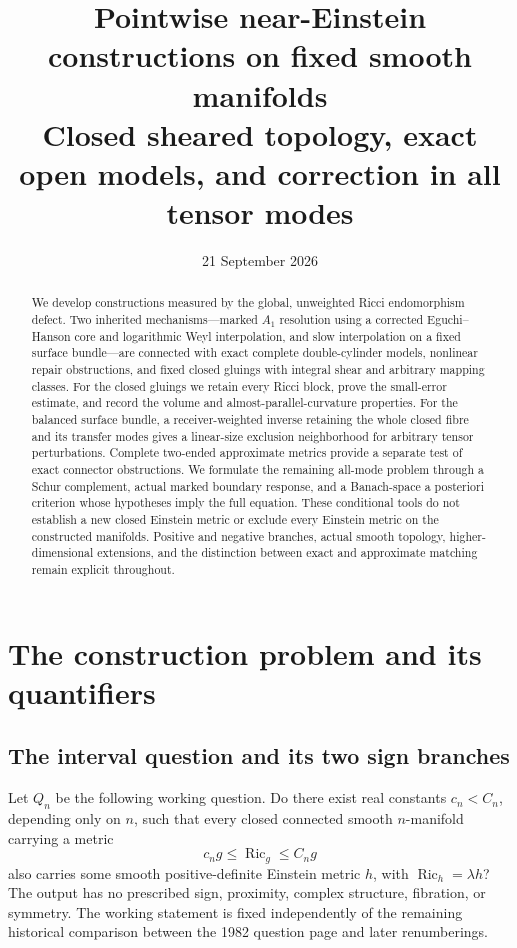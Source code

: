 \documentclass[a4paper,11pt]{article}
\title{Pointwise near-Einstein constructions on fixed smooth manifolds\\
  \large Closed sheared topology, exact open models, and correction in all tensor modes}
\author{}
\date{21 September 2026}
\theoremstyle{definition}
\DeclareMathOperator{\Ric}{Ric}\DeclareMathOperator{\Rm}{Rm}
\begin{document}
\maketitle
\begin{abstract}
We develop constructions measured by the global, unweighted Ricci
endomorphism defect. Two inherited mechanisms---marked $A_1$ resolution
using a corrected Eguchi--Hanson core and logarithmic Weyl interpolation,
and slow interpolation on a fixed surface bundle---are connected with
exact complete double-cylinder models, nonlinear repair obstructions, and
fixed closed gluings with integral shear and arbitrary mapping classes.
For the closed gluings we retain every Ricci block, prove the small-error
estimate, and record the volume and almost-parallel-curvature properties.
For the balanced surface bundle, a receiver-weighted inverse retaining the
whole closed fibre and its transfer modes gives a linear-size exclusion
neighborhood for arbitrary tensor perturbations. Complete two-ended
approximate metrics provide a separate test of exact connector obstructions.
We formulate the remaining all-mode problem through a Schur complement,
actual marked boundary response, and a Banach-space a posteriori criterion
whose hypotheses imply the full equation. These conditional tools do not
establish a new closed Einstein metric or exclude every Einstein metric
on the constructed manifolds. Positive and negative branches, actual smooth
topology, higher-dimensional extensions, and the distinction between exact
and approximate matching remain explicit throughout.
\end{abstract}
\tableofcontents
\clearpage

\section{The construction problem and its quantifiers}\label{sec:problem}
\subsection{The interval question and its two sign branches}\label{sec:quantifiers}
Let $Q_n$ be the following working question. Do there exist real constants
$c_n<C_n$, depending only on $n$, such that every closed connected smooth
$n$-manifold carrying a metric
\[
             c_ng\le\Ric_g\le C_ng
\]
also carries some smooth positive-definite Einstein metric
$h$, with $\Ric_h=\lambda h$? The output has no prescribed sign,
proximity, complex structure, fibration, or symmetry. The working statement
is fixed independently of the remaining historical comparison between the
1982 question page and later renumberings.
\end{document}

